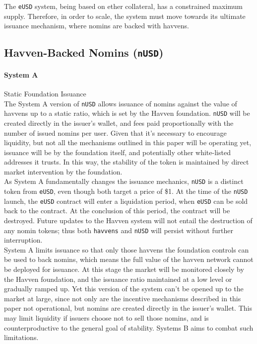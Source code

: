 \noindent The \texttt{eUSD} system, being based on ether collateral, has a constrained
maximum supply. Therefore, in order to scale, the system must move towards its ultimate
issuance mechanism, where nomins are backed with havvens.

\pagebreak
\subsection{Havven-Backed Nomins (\texttt{nUSD})}

\paragraph{System A} Static Foundation Issuance \\

\noindent The System A version of \texttt{nUSD} allows issuance of nomins against
the value of havvens up to a static ratio, which is set by the Havven foundation.
\texttt{nUSD} will be created directly in the issuer's wallet, and fees paid
proportionally with the number of issued nomins per user. Given that it's necessary to
encourage liquidity, but not all the mechanisms outlined in this paper will be operating
yet, issuance will be by the foundation itself, and potentially other white-listed
addresses it trusts. In this way, the stability of the token is maintained by direct
market intervention by the foundation. \\

\noindent As System A fundamentally changes the issuance mechanics, \texttt{nUSD} is a distinct
token from \texttt{eUSD}, even though both target a price of \$1. At the time of the \texttt{nUSD}
launch, the \texttt{eUSD} contract will enter a liquidation period, when \texttt{eUSD}
can be sold back to the contract. At the conclusion of this period, the contract will be destroyed.
Future updates to the Havven system will not entail the destruction of any nomin tokens;
thus both \texttt{havvens} and \texttt{nUSD} will persist without further interruption. \\

\noindent System A limits issuance so that only those havvens the foundation controls can be
used to back nomins, which means the full value of the havven network cannot be deployed for
issuance. At this stage the market will be monitored closely by the Havven foundation, 
and the issuance ratio maintained at a low level or gradually ramped up. 
Yet this version of the system can't be opened up to the market at large, since not only are
the incentive mechanisms described in this paper not operational, but nomins are created
directly in the issuer's wallet. This may limit liquidity if issuers choose not to sell those
nomins, and is counterproductive to the general goal of stability. Systems B aims to combat
such limitations. \\


